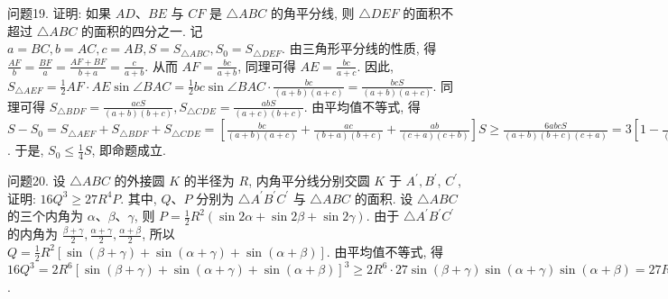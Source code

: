 问题19. 证明: 如果 $A D 、 B E$ 与 $C F$ 是 $\triangle A B C$ 的角平分线, 则 $\triangle D E F$ 的面积不超过 $\triangle A B C$ 的面积的四分之一.
记 $a=B C, b=A C, c=A B, S=S_{\triangle A B C}, S_0=S_{\triangle D E F}$. 由三角形平分线的性质, 得 $\frac{A F}{b}=\frac{B F}{a}=\frac{A F+B F}{b+a}=\frac{c}{a+b}$. 从而 $A F=\frac{b c}{a+b}$, 同理可得 $A E=\frac{b c}{a+c}$. 因此, $S_{\triangle A E F}=\frac{1}{2} A F \cdot A E \sin \angle B A C=\frac{1}{2} b c \sin \angle B A C \cdot\frac{b c}{(a+b)(a+c)}=\frac{b c S}{(a+b)(a+c)}$. 同理可得 $S_{\triangle B D F}=\frac{a c S}{(a+b)(b+c)}, S_{\triangle C D E}= \frac{a b S}{(a+c)(b+c)}$. 由平均值不等式, 得 $S-S_0=S_{\triangle A E F}+S_{\triangle B D F}+S_{\triangle C D E}= \left[\frac{b c}{(a+b)(a+c)}+\frac{a c}{(b+a)(b+c)}+\frac{a b}{(c+a)(c+b)}\right] S \geqslant \frac{6 a b c S}{(a+b)(b+c)(c+a)}= 3\left[1-\frac{b c}{(a+b)(a+c)}-\frac{a c}{(a+b)(c+b)}-\frac{a b}{(a+c)(c+b)}\right] S=3\left(S-S_{\triangle A E F}-\right. \left.S_{\triangle B D F}-S_{\triangle C D E}\right)=3 S_0$. 于是, $S_0 \leqslant \frac{1}{4} S$, 即命题成立.



问题20. 设 $\triangle A B C$ 的外接圆 $K$ 的半径为 $R$, 内角平分线分别交圆 $K$ 于 $A^{\prime}, B^{\prime}$, $C^{\prime}$, 证明: $16 Q^3 \geqslant 27 R^4 P$. 其中, $Q 、 P$ 分别为 $\triangle A^{\prime} B^{\prime} C^{\prime}$ 与 $\triangle A B C$ 的面积.
设 $\triangle A B C$ 的三个内角为 $\alpha 、 \beta 、 \gamma$, 则 $P=\frac{1}{2} R^2(\sin 2 \alpha+\sin 2 \beta+ \sin 2 \gamma)$. 由于 $\triangle A^{\prime} B^{\prime} C^{\prime}$ 的内角为 $\frac{\beta+\gamma}{2}, \frac{\alpha+\gamma}{2}, \frac{\alpha+\beta}{2}$, 所以 $Q=\frac{1}{2} R^2[\sin (\beta+ \gamma)+\sin (\alpha+\gamma)+\sin (\alpha+\beta)]$. 由平均值不等式, 得 $16 Q^3=2 R^6[\sin (\beta+\gamma)+ \sin (\alpha+\gamma)+\sin (\alpha+\beta)]^3 \geqslant 2 R^6 \cdot 27 \sin (\beta+\gamma) \sin (\alpha+\gamma) \sin (\alpha+\beta)= 27 R^6[\cos (\alpha-\beta)+\cos \gamma] \sin (\alpha+\beta)=\frac{27}{2} R^6[\sin (\alpha+\beta+\gamma)+\sin (\alpha+\beta-\gamma)+ \sin 2 \alpha+\sin 2 \beta]=\frac{27}{2} R^6(\sin 2 \alpha+\sin 2 \beta+\sin 2 \gamma)=27 R^4 P$.



